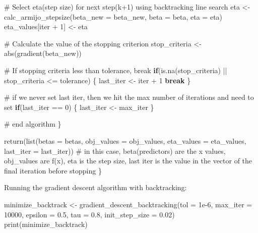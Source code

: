 \documentclass[
  letterpaper,
  DIV=11,
  numbers=noendperiod]{scrartcl}
\newenvironment{Shaded}{\begin{snugshade}}{\end{snugshade}}
\newcommand{\AttributeTok}[1]{\textcolor[rgb]{0.40,0.45,0.13}{#1}}
\newcommand{\CommentTok}[1]{\textcolor[rgb]{0.37,0.37,0.37}{#1}}
\newcommand{\ControlFlowTok}[1]{\textcolor[rgb]{0.00,0.23,0.31}{\textbf{#1}}}
\newcommand{\DecValTok}[1]{\textcolor[rgb]{0.68,0.00,0.00}{#1}}
\newcommand{\FloatTok}[1]{\textcolor[rgb]{0.68,0.00,0.00}{#1}}
\newcommand{\FunctionTok}[1]{\textcolor[rgb]{0.28,0.35,0.67}{#1}}
\newcommand{\NormalTok}[1]{\textcolor[rgb]{0.00,0.23,0.31}{#1}}
\newcommand{\OtherTok}[1]{\textcolor[rgb]{0.00,0.23,0.31}{#1}}
\newcommand{\SpecialCharTok}[1]{\textcolor[rgb]{0.37,0.37,0.37}{#1}}
\begin{document}
\begin{Shaded}
\begin{Highlighting}[]
    \CommentTok{\# Select eta(step size) for next step(k+1) using backtracking line search}
\NormalTok{    eta }\OtherTok{\textless{}{-}} \FunctionTok{calc\_armijo\_stepsize}\NormalTok{(}\AttributeTok{beta\_new =}\NormalTok{ beta\_new, }\AttributeTok{beta =}\NormalTok{ beta, }\AttributeTok{eta =}\NormalTok{ eta)}
\NormalTok{    eta\_values[iter }\SpecialCharTok{+} \DecValTok{1}\NormalTok{] }\OtherTok{\textless{}{-}}\NormalTok{ eta}
    
    \CommentTok{\# Calculate the value of the stopping criterion}
\NormalTok{    stop\_criteria }\OtherTok{\textless{}{-}} \FunctionTok{abs}\NormalTok{(}\FunctionTok{gradient}\NormalTok{(beta\_new))}
    
    \CommentTok{\# If stopping criteria less than tolerance, break}
    \ControlFlowTok{if}\NormalTok{(}\FunctionTok{is.na}\NormalTok{(stop\_criteria) }\SpecialCharTok{||}\NormalTok{ stop\_criteria }\SpecialCharTok{\textless{}=}\NormalTok{ tolerance) \{ }
\NormalTok{      last\_iter }\OtherTok{\textless{}{-}}\NormalTok{ iter }\SpecialCharTok{+} \DecValTok{1}
      \ControlFlowTok{break} 
\NormalTok{    \}}
    
    \CommentTok{\# if we never set last iter, then we hit the max number of iterations and need to set}
    \ControlFlowTok{if}\NormalTok{(last\_iter }\SpecialCharTok{==} \DecValTok{0}\NormalTok{) \{ last\_iter }\OtherTok{\textless{}{-}}\NormalTok{ max\_iter \}}
    
    \CommentTok{\# end algorithm}
\NormalTok{  \}}
  
  \FunctionTok{return}\NormalTok{(}\FunctionTok{list}\NormalTok{(}\AttributeTok{betas =}\NormalTok{ betas, }\AttributeTok{obj\_values =}\NormalTok{ obj\_values, }\AttributeTok{eta\_values =}\NormalTok{ eta\_values, }\AttributeTok{last\_iter =}\NormalTok{ last\_iter)) }\CommentTok{\# in this case, beta(predictors) are the x values, obj\_values are f(x), eta is the step size, last iter is the value in the vector of the final iteration before stopping}
\NormalTok{\}}
\end{Highlighting}
\end{Shaded}

Running the gradient descent algorithm with backtracking:

\begin{Shaded}
\begin{Highlighting}[]
\NormalTok{minimize\_backtrack }\OtherTok{\textless{}{-}} \FunctionTok{gradient\_descent\_backtracking}\NormalTok{(}\AttributeTok{tol =} \FloatTok{1e{-}6}\NormalTok{, }\AttributeTok{max\_iter =} \DecValTok{10000}\NormalTok{, }\AttributeTok{epsilon =} \FloatTok{0.5}\NormalTok{, }\AttributeTok{tau =} \FloatTok{0.8}\NormalTok{, }\AttributeTok{init\_step\_size =} \FloatTok{0.02}\NormalTok{)}
\FunctionTok{print}\NormalTok{(minimize\_backtrack)}
\end{Highlighting}
\end{Shaded}
\end{document}
